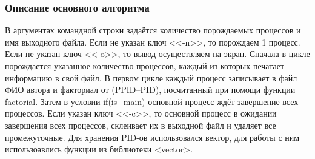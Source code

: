 \documentclass[a4paper,12pt]{extarticle}
\begin{document}
\subsubsection{Описание основного алгоритма}
В  аргументах  командной  строки  задаётся  количество  порождаемых процессов и имя выходного файла. Если не  указан  ключ <<-n>>, то  порождаем 1  процесс. Если не указан ключ <<-o>>, то вывод осуществляем на экран. Сначала в цикле порождается  указанное  количество  процессов,  каждый  из которых печатает информацию в  свой   файл. В первом цикле каждый  процесс записывает  в  файл  ФИО  автора  и  факториал от (PPID–PID), посчитанный при помощи функции factorial. Затем в условии if(is\_main) основной процесс  ждёт  завершение  всех  процессов. Если указан ключ <<-c>>, то основной процесс в ожидании завершения  всех  процессов,  склеивает  их  в  выходной файл и удаляет все промежуточные. Для хранения PID-ов использовался вектор, для работы с ним использоавлись функции из библиотеки <vector>.
\end{document}

